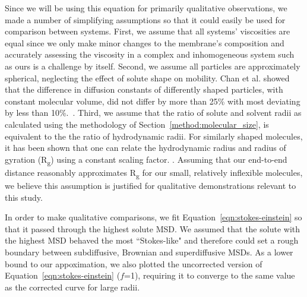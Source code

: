 \documentclass[journal=jpcbfk,manuscript=article]{achemso}
\begin{document}
  Since we will be using this equation for primarily qualitative observations, 
  we made a number of simplifying assumptions so that it could easily be used for 
  comparison between systems. First, we assume that all systems' viscosities
  are equal since we only make minor changes to the membrane's composition and
  accurately assessing the viscosity in a complex and inhomogeneous system such 
  as ours is a challenge by itself. Second, we assume all particles are approximately
  spherical, neglecting the effect of solute shape on mobility. Chan et al. 
  showed that the difference in diffusion constants of differently shaped 
  particles, with constant molecular volume, did not differ by more than 25\%
  with most deviating by less than 10\%.~\cite{chan_effects_2015}. 
  Third, we assume that the ratio of solute and solvent radii as calculated using the
  methodology of Section~\ref{method:molecular_size}, is equivalent to the the 
  ratio of hydrodynamic radii. For similarly shaped molecules, it has been shown that
  one can relate the hydrodynamic radius and radius of gyration (R\textsubscript{g})
  using a constant scaling factor. \cite{lee_molecular_2008,he_novel_2003,li_critical_2009}.
  Assuming that our end-to-end distance reasonably approximates R\textsubscript{g} 
  for our small, relatively inflexible molecules, we believe this assumption is 
  justified for qualitative demonstrations relevant to this study. 
  
  In order to make qualitative comparisons, we fit Equation~\ref{eqn:stokes-einstein}
  so that it passed through the highest solute MSD. We assumed that the solute
  with the highest MSD behaved the most ``Stokes-like" and therefore could set a
  rough boundary between subdiffusive, Brownian and superdiffusive MSDs. As a lower
  bound to our appoximation, we also plotted the uncorrected version of 
  Equation~\ref{eqn:stokes-einstein} ($f$=1), requiring it to converge to the same 
  value as the corrected curve for large radii. 

  
\end{document}
